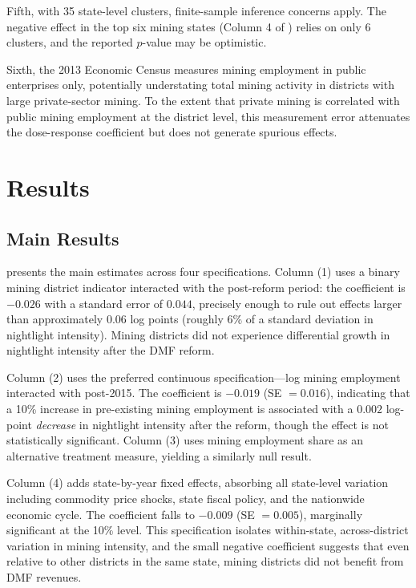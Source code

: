 \documentclass[12pt]{article}
\begin{document}
Fifth, with 35 state-level clusters, finite-sample inference concerns apply. The negative effect in the top six mining states (Column 4 of ) relies on only 6 clusters, and the reported $p$-value may be optimistic.

Sixth, the 2013 Economic Census measures mining employment in public enterprises only, potentially understating total mining activity in districts with large private-sector mining. To the extent that private mining is correlated with public mining employment at the district level, this measurement error attenuates the dose-response coefficient but does not generate spurious effects.

\section{Results}

\subsection{Main Results}

 presents the main estimates across four specifications. Column (1) uses a binary mining district indicator interacted with the post-reform period: the coefficient is $-0.026$ with a standard error of $0.044$, precisely enough to rule out effects larger than approximately 0.06 log points (roughly 6\% of a standard deviation in nightlight intensity). Mining districts did not experience differential growth in nightlight intensity after the DMF reform.

Column (2) uses the preferred continuous specification---log mining employment interacted with post-2015. The coefficient is $-0.019$ (SE $= 0.016$), indicating that a 10\% increase in pre-existing mining employment is associated with a $0.002$ log-point \textit{decrease} in nightlight intensity after the reform, though the effect is not statistically significant. Column (3) uses mining employment share as an alternative treatment measure, yielding a similarly null result.

Column (4) adds state-by-year fixed effects, absorbing all state-level variation including commodity price shocks, state fiscal policy, and the nationwide economic cycle. The coefficient falls to $-0.009$ (SE $= 0.005$), marginally significant at the 10\% level. This specification isolates within-state, across-district variation in mining intensity, and the small negative coefficient suggests that even relative to other districts in the same state, mining districts did not benefit from DMF revenues.
\end{document}
